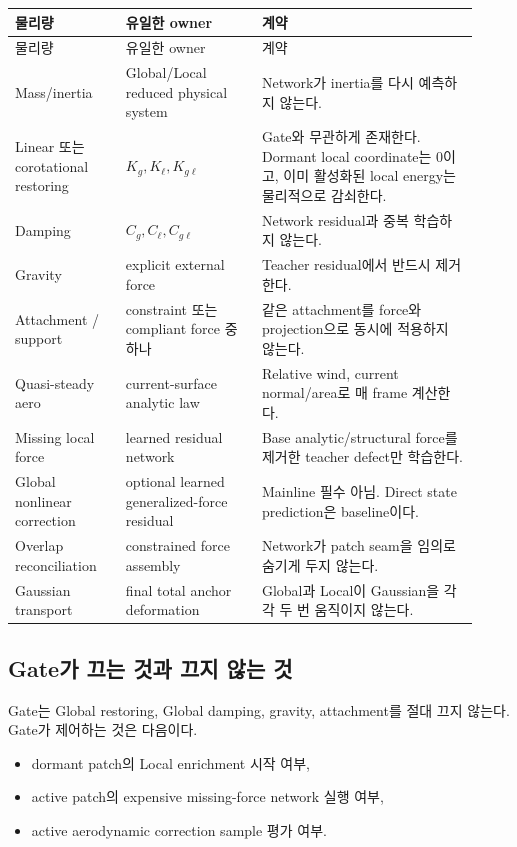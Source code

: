 \documentclass[11pt,a4paper]{article}
\begin{document}
\begin{longtable}{L{0.22\linewidth}L{0.27\linewidth}L{0.43\linewidth}}
\toprule
물리량 & 유일한 owner & 계약 \\
\midrule
\endfirsthead
\toprule
물리량 & 유일한 owner & 계약 \\
\midrule
\endhead
Mass/inertia & Global/Local reduced physical system & Network가 inertia를 다시 예측하지 않는다. \\
\addlinespace
Linear 또는 corotational restoring & \(K_g,K_\ell,K_{g\ell}\) & Gate와 무관하게 존재한다. Dormant local coordinate는 0이고, 이미 활성화된 local energy는 물리적으로 감쇠한다. \\
\addlinespace
Damping & \(C_g,C_\ell,C_{g\ell}\) & Network residual과 중복 학습하지 않는다. \\
\addlinespace
Gravity & explicit external force & Teacher residual에서 반드시 제거한다. \\
\addlinespace
Attachment / support & constraint 또는 compliant force 중 하나 & 같은 attachment를 force와 projection으로 동시에 적용하지 않는다. \\
\addlinespace
Quasi-steady aero & current-surface analytic law & Relative wind, current normal/area로 매 frame 계산한다. \\
\addlinespace
Missing local force & learned residual network & Base analytic/structural force를 제거한 teacher defect만 학습한다. \\
\addlinespace
Global nonlinear correction & optional learned generalized-force residual & Mainline 필수 아님. Direct state prediction은 baseline이다. \\
\addlinespace
Overlap reconciliation & constrained force assembly & Network가 patch seam을 임의로 숨기게 두지 않는다. \\
\addlinespace
Gaussian transport & final total anchor deformation & Global과 Local이 Gaussian을 각각 두 번 움직이지 않는다. \\
\bottomrule
\end{longtable}

\subsection{Gate가 끄는 것과 끄지 않는 것}

Gate는 Global restoring, Global damping, gravity, attachment를 절대 끄지 않는다.
Gate가 제어하는 것은 다음이다.

\begin{itemize}[leftmargin=1.5em]
  \item dormant patch의 Local enrichment 시작 여부,
  \item active patch의 expensive missing-force network 실행 여부,
  \item active aerodynamic correction sample 평가 여부.
\end{itemize}
\end{document}
